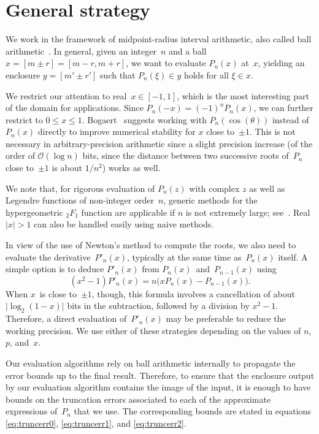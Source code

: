 \documentclass[nohypdvips,review]{siamart0216}
\newcommand{\abs}[1]{\mathopen| #1 \mathclose|}
\newcommand{\OO}{\mathcal{O}}
\begin{document}
\section{General strategy}

\label{sec:general}

We work in the framework of midpoint-radius interval arithmetic,
also called ball arithmetic~\cite{vdH:ball,Johansson2017arb}.
In general, given an integer~$n$ and a ball $x = [m \pm r] = [m-r, m+r]$,
we want to evaluate $P_n(x)$ at~$x$,
yielding an enclosure $y = [m' \pm r']$ such that $P_n(\xi) \in y$
holds for all $\xi \in x$.

We restrict our attention to real~$x \in [-1, 1]$,
which is the most interesting part of the domain for applications.
Since $P_n(-x) = (-1)^n P_n(x)$, we can further
restrict to $0 \le x \le 1$.
Bogaert~\cite{bogaert2014iteration} suggests
working with $P_n(\cos(\theta))$ instead of $P_n(x)$
directly to improve numerical stability for $x$ close to~$\pm 1$.
This is not necessary in arbitrary-precision arithmetic since
a slight precision increase (of the order of $\OO(\log n)$ bits, since
the distance between two successive roots of~$P_n$ close to~$\pm1$ is
about $1/n^2$) works as well.

We note that, for rigorous evaluation of $P_n(z)$ with complex $z$
as well as Legendre functions of non-integer order $n$,
generic methods for the hypergeometric ${}_2F_1$ function
are applicable if $n$ is not extremely large; see~\cite{johansson2016hypergeometric}.
Real $|x| > 1$ can also be handled easily using naive methods.

In view of the use of Newton's method to compute the roots,
we also need to evaluate the derivative $P'_n(x)$,
typically at the same time as $P_n(x)$ itself.
A simple option is to deduce $P'_n(x)$ from
$P_n(x)$ and $P_{n-1}(x)$ using
\begin{equation} \label{eq:mixed}
  (x^2 - 1) P'_n(x) = n \bigl( x P_n(x) - P_{n-1}(x) \bigl).
\end{equation}
When $x$ is close to~$\pm 1$, though, this formula involves a
cancellation of about $\abs{\log_2(1 - x)}$ bits in the subtraction,
followed by a division by $x^2 - 1$.
Therefore, a direct evaluation of $P'_n(x)$ may be preferable to reduce
the working precision.
We use either of these strategies depending on the values of
$n$, $p$, and~$x$.

Our evaluation algorithms rely on ball arithmetic internally to
propagate the error bounds up to the final result.
Therefore, to ensure that the enclosure output by our evaluation
algorithm contains the image of the input, it is enough to have bounds
on the truncation errors associated to each of the approximate
expressions of~$P_n$ that we use.
The corresponding bounds are stated in equations \eqref{eq:truncerr0},
\eqref{eq:truncerr1}, and \eqref{eq:truncerr2}.
\end{document}
